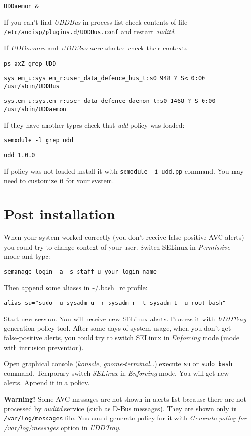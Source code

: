 \texttt{UDDaemon \&}

If you can't find \emph{UDDBus} in process list check contents of file
\texttt{/etc/audisp/plugins.d/UDDBus.conf} and restart \emph{auditd}.

If \emph{UDDaemon} and \emph{UDDBus} were started check their contexts:

\texttt{ps axZ \textbar{} grep UDD}

\texttt{system\_u:system\_r:user\_data\_defence\_bus\_t:s0 948 ? S\textless{}   0:00 /usr/sbin/UDDBus}

\texttt{system\_u:system\_r:user\_data\_defence\_daemon\_t:s0 1468 ? S   0:00 /usr/sbin/UDDaemon}

If they have another types check that \emph{udd} policy was loaded:

\texttt{semodule -l \textbar{} grep udd}

\texttt{udd     1.0.0}

If policy was not loaded install it with \texttt{semodule -i udd.pp}
command. You may need to customize it for your system.

\section{Post installation}

When your system worked correctly (you don't receive false-positive AVC
alerts) you could try to change context of your user. Switch SELinux in
\emph{Permissive} mode and type:

\texttt{semanage login -a -s staff\_u your\_login\_name}

Then append some aliases in \textasciitilde{}/.bash\_rc profile:

\texttt{alias su="sudo -u sysadm\_u -r sysadm\_r -t sysadm\_t -u root bash"}

Start new session. You will receive new SELinux alerts. Process it with
\emph{UDDTray} generation policy tool. After some days of system usage,
when you don't get false-positive alerts, you could try to switch
SELinux in \emph{Enforcing} mode (mode with intrusion prevention).

Open graphical console (\emph{konsole}, \emph{gnome-terminal}\ldots{})
execute \texttt{su} or \texttt{sudo bash} command. Temporary switch
\emph{SELinux} in \emph{Enforcing} mode. You will get new alerts. Append
it in a policy.

\textbf{Warning!} Some AVC messages are not shown in alerts list because
there are not processed by \emph{auditd} service (such as D-Bus
messages). They are shown only in \texttt{/var/log/messages} file. You
could generate policy for it with \emph{Generate policy for
/var/log/messages} option in \emph{UDDTray}.

